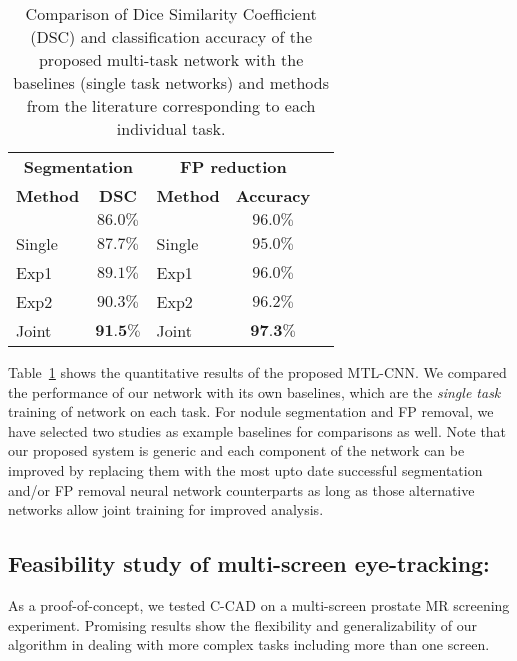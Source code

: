 \documentclass[preprint,12pt]{elsarticle}
\begin{document}
\begin{table}[h]
\centering
\caption{Comparison of Dice Similarity Coefficient (DSC) and classification accuracy of the proposed multi-task network with the baselines (single task networks) and methods from the literature corresponding to each individual task. }
\label{table:comparison}
\begin{tabular}{|l|c|l|c|l}
\cline{1-4}
\multicolumn{2}{|c|}{\cellcolor[HTML]{b2b2b2} \textbf{Segmentation}} & \multicolumn{2}{c|}{\cellcolor[HTML]{b2b2b2} \textbf{FP reduction}} &  \\ \cline{1-4}
\multicolumn{1}{|c|}{ \textbf{Method}} &  \textbf{DSC}  & \multicolumn{1}{c|}{ \textbf{Method}} &  \textbf{Accuracy} &  \\ \cline{1-4}
 \cite{khosravan2016gaze2segment}  &   $86.0\%$    &  \cite{dou2017multilevel}  &  $96.0\%$  &  \\ \cline{1-4}
 Single &   $87.7\%$  &    Single   &   $95.0\%$   &  \\ \cline{1-4}
 Exp1 &   $89.1\%$  &    Exp1   &   $96.0\%$   &  \\ \cline{1-4}
 Exp2 &   $90.3\%$  &    Exp2   &   $96.2\%$   &  \\ \cline{1-4}
   Joint  &    $\textbf{91.5\%}$    & Joint &  $\textbf{97.3\%}$   &  \\ \cline{1-4}
\end{tabular}
\end{table}


Table~\ref{table:comparison} shows the quantitative results of the proposed MTL-CNN. We compared the performance of our network with its own baselines, which are the \textit{single task} training of network on each task. For nodule segmentation and FP removal, we have selected two studies as example baselines for comparisons as well. Note that our proposed system is generic and each component of the network can be improved by replacing them with the most upto date successful segmentation and/or FP removal neural network counterparts as long as those alternative networks allow joint training for improved analysis.




















\subsection{Feasibility study of multi-screen eye-tracking:}
As a proof-of-concept, we tested C-CAD on a multi-screen prostate MR screening experiment. Promising results show the flexibility and generalizability of our algorithm in dealing with more complex tasks including more than one screen.
\end{document}
